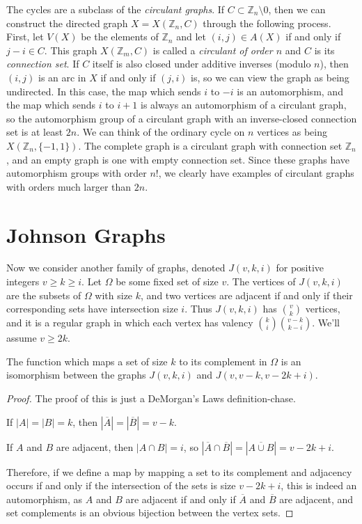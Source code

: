 The cycles are a subclass of the \textit{circulant graphs}.  If $C\subset \mathbb{Z}_n{\setminus}0$, then we can construct the directed graph $X=X(\mathbb{Z}_n,C)$ through the following process.  First, let $V(X)$ be the elements of $\mathbb{Z}_n$ and let $(i,j)\in A(X)$ if and only if $j-i\in C$.  This graph $X(\mathbb{Z}_m,C)$ is called a \textit{circulant of order $n$} and $C$ is its \textit{connection set}.  If $C$ itself is also closed under additive inverses (modulo $n$), then $(i,j)$ is an arc in $X$ if and only if $(j,i)$ is, so we can view the graph as being undirected.  In this case, the map which sends $i$ to $-i$ is an automorphism, and the map which sends $i$ to $i+1$ is always an automorphism of a circulant graph, so the automorphism group of a circulant graph with an inverse-closed connection set is at least $2n$.  We can think of the ordinary cycle on $n$ vertices as being $X(\mathbb{Z}_n,\{-1,1\})$.  The complete graph is a circulant graph with connection set $\mathbb{Z}_n$, and an empty graph is one with empty connection set.  Since these graphs have automorphism groups with order $n!$, we clearly have examples of circulant graphs with orders much larger than $2n$.

\section*{Johnson Graphs}

Now we consider another family of graphs, denoted $J(v,k,i)$ for positive integers $v\geq k\geq i$.  Let $\Omega$ be some fixed set of size $v$.  The vertices of $J(v,k,i)$ are the subsets of $\Omega$ with size $k$, and two vertices are adjacent if and only if their corresponding sets have intersection size $i$.  Thus $J(v,k,i)$ has $\binom{v}{k}$ vertices, and it is a regular graph in which each vertex has valency $\binom{k}{i}\binom{v-k}{k-i}$.  We'll assume $v\geq 2k$.

\begin{lemma}
{The function which maps a set of size $k$ to its complement in $\Omega$ is an isomorphism between the graphs $J(v,k,i)$ and $J(v,v-k,v-2k+i)$.}
\end{lemma}
\begin{proof}
	The proof of this is just a DeMorgan's Laws definition-chase.  
	
	If $|A|=|B|=k$, then $|\overline{A}|=|\overline{B}|=v-k$.
	
	If $A$ and $B$ are adjacent, then $|A\cap B|=i$, so $|\overline{A}\cap\overline{B}| = |\overline{A\cup B}| = v-2k+i$.
	
	Therefore, if we define a map by mapping a set to its complement and adjacency occurs if and only if the intersection of the sets is size $v-2k+i$, this is indeed an automorphism, as $A$ and $B$ are adjacent if and only if $\overline{A}$ and $\overline{B}$ are adjacent, and set complements is an obvious bijection between the vertex sets.
	
	
	
\end{proof}

